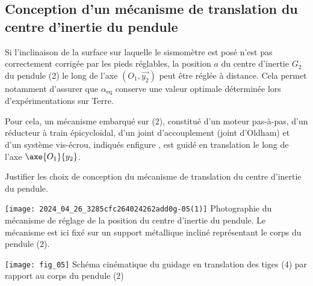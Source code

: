 \subsection{Conception d'un mécanisme de translation du centre d'inertie du pendule}
Si l'inclinaison de la surface sur laquelle le sismomètre est posé n'est pas correctement corrigée par les pieds réglables, la position $a$ du centre d'inertie $G_{2}$ du pendule (2) le long de l'axe $\left(O_{1}, \overrightarrow{y_{2}}\right)$ peut être réglée à distance. Cela permet notamment d'assurer que $\alpha_{\mathrm{eq}}$ conserve une valeur optimale déterminée lors d'expérimentations sur Terre.

Pour cela, un mécanisme embarqué sur (2), constitué d'un moteur pas-à-pas, d'un réducteur à train épicycloïdal, d'un joint d'accouplement (joint d'Oldham) et d'un système vis-écrou, indiqués enfigure \label{ccmp2023_fig_04}, est guidé en translation le long de l'axe  $\axe{O_1}{y_2}$.

\begin{obj}
Justifier les choix de conception du mécanisme de translation du centre d'inertie du pendule.
\end{obj}



\begin{minipage}[c]{.45\linewidth}
    \texttt{[image: 2024\_04\_26\_3285cfc264024262add0g-05(1)]}
     {\label{ccmp2023_fig_04} Photographie du mécanisme de réglage de la position du centre d'inertie du pendule. Le mécanisme est ici fixé sur un support métallique incliné représentant le corps du pendule (2).}
\end{minipage}
\hfill
\begin{minipage}[c]{.45\linewidth}
\begin{center}
        \texttt{[image: fig\_05]}
         {\label{ccmp2023_fig_05} Schéma cinématique du guidage en translation des tiges (4) par rapport au corps du pendule (2)}
\end{center}
\end{minipage}


